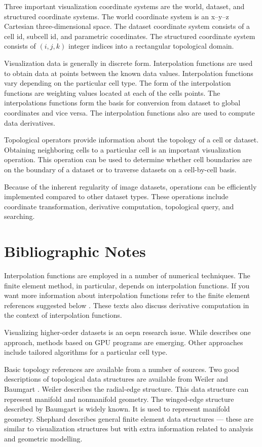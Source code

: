 Three important visualization coordinate systems are the world, dataset, and structured coordinate systems. The world coordinate system is an x--y--z Cartesian three-dimensional space. The dataset coordinate system consists of a cell id, subcell id, and parametric coordinates. The structured coordinate system consists of $(i,j,k)$ integer indices into a rectangular topological domain.

Visualization data is generally in discrete form. Interpolation functions are used to obtain data at points between the known data values. Interpolation functions vary depending on the particular cell type. The form of the interpolation functions are weighting values located at each of the cells points. The interpolations functions form the basis for conversion from dataset to global coordinates and vice versa. The interpolation functions also are used to compute data derivatives.

Topological operators provide information about the topology of a cell or dataset. Obtaining neighboring cells to a particular cell is an important visualization operation. This operation can be used to determine whether cell boundaries are on the boundary of a dataset or to traverse datasets on a cell-by-cell basis.

Because of the inherent regularity of image datasets, operations can be efficiently implemented compared to other dataset types. These operations include coordinate transformation, derivative computation, topological query, and searching.

\section{Bibliographic Notes}
\label{bibnote:advanced_data_representation}

Interpolation functions are employed in a number of numerical techniques. The finite element method, in particular, depends on interpolation functions. If you want more information about interpolation functions refer to the finite element references suggested below \cite{Cook89} \cite{Gallagher75} \cite{Zienkiewicz87}. These texts also discuss derivative computation in the context of interpolation functions.

Visualizing higher-order datasets is an oepn research issue. While \cite{Schroeder06} describes one approach, methods based on GPU programs are emerging. Other approaches include tailored algorithms for a particular cell type.

Basic topology references are available from a number of sources. Two good descriptions of topological data structures are available from Weiler \cite{Weiler86} \cite{Weiler88} and Baumgart \cite{Baumgart74}. Weiler describes the radial-edge structure. This data structure can represent manifold and nonmanifold geometry. The winged-edge structure described by Baumgart is widely known. It is used to represent manifold geometry. Shephard \cite{Shephard88} describes general finite element data structures — these are similar to visualization structures but with extra information related to analysis and geometric modelling.

